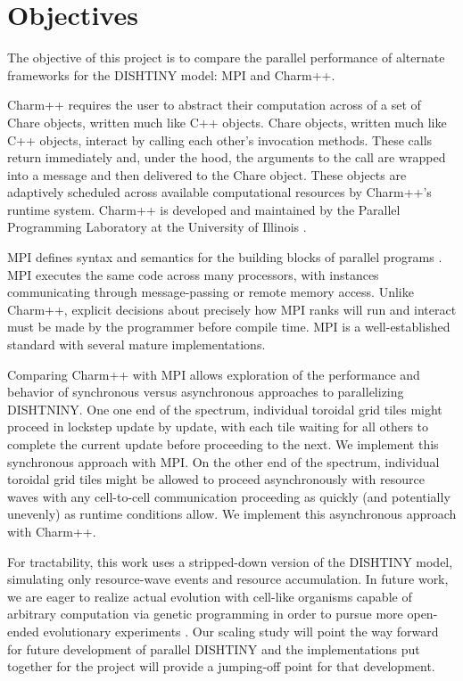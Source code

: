 \section{Objectives}

The objective of this project is to compare the parallel performance of alternate frameworks for the DISHTINY model: MPI and Charm++.

Charm++ requires the user to abstract their computation across of a set of Chare objects, written much like C++ objects.
Chare objects, written much like C++ objects, interact by calling each other's invocation methods.
These calls return immediately and, under the hood, the arguments to the call are wrapped into a message and then delivered to the Chare object.
These objects are adaptively scheduled across available computational resources by Charm++'s runtime system.
Charm++ is developed and maintained by the Parallel Programming Laboratory at the University of Illinois \cite{kale1993charm+}.

MPI defines syntax and semantics for the building blocks of parallel programs \cite{Forum:1994:MMI:898758}.
MPI executes the same code across many processors, with instances communicating through message-passing or remote memory access.
Unlike Charm++, explicit decisions about precisely how MPI ranks will run and interact must be made by the programmer before compile time.
MPI is a well-established standard with several mature implementations.

Comparing Charm++ with MPI allows exploration of the performance and behavior of synchronous versus asynchronous approaches to parallelizing DISHTNINY.
One one end of the spectrum, individual toroidal grid tiles might proceed in lockstep update by update, with each tile waiting for all others to complete the current update before proceeding to the next.
We implement this synchronous approach with MPI.
On the other end of the spectrum, individual toroidal grid tiles might be allowed to proceed asynchronously with resource waves with any cell-to-cell communication proceeding as quickly (and potentially unevenly) as runtime conditions allow.
We implement this asynchronous approach with Charm++.

For tractability, this work uses a stripped-down version of the DISHTINY model, simulating only resource-wave events and resource accumulation.
In future work, we are eager to realize actual evolution with cell-like organisms capable of arbitrary computation via genetic programming in order to pursue more open-ended evolutionary experiments \cite{lalejini2018evolving}.
Our scaling study will point the way forward for future development of parallel DISHTINY and the implementations put together for the project will provide a jumping-off point for that development.
